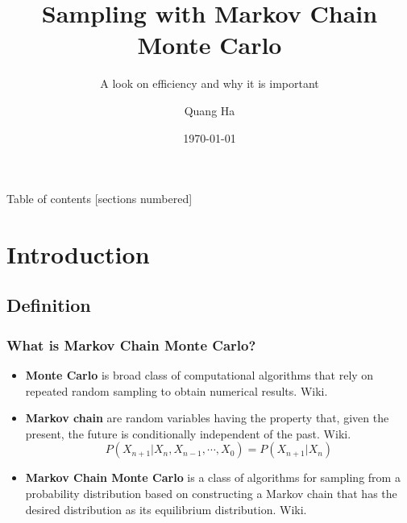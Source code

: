 \documentclass[10pt]{beamer}
\title{Sampling with Markov Chain Monte Carlo}
\subtitle{A look on efficiency and why it is important}
\date{\today}
\author{Quang Ha}
\begin{document}
\maketitle

\begin{frame}[plain]{Table of contents}
	[sections numbered]
	\tableofcontents[hideallsubsections]
\end{frame}	

\section{Introduction}
\subsection{Definition}

\begin{frame}
	\frametitle{What is Markov Chain Monte Carlo?}
	\begin{itemize}
		\item \textbf{Monte Carlo} is broad class of computational algorithms that rely on repeated random sampling to obtain numerical results. \tiny{Wiki}. \normalsize
		\item \textbf{Markov chain} are random variables having the property that, given the present, the future is conditionally independent of the past. \tiny{Wiki}. \normalsize
			\begin{equation*}
				P(X_{n+1}|X_{n}, X_{n-1}, \cdots, X_0) = P(X_{n+1}|X_{n})
			\end{equation*}
		\item \textbf{Markov Chain Monte Carlo} is a class of algorithms for sampling from a probability distribution based on constructing a Markov chain that has the desired distribution as its equilibrium distribution. \tiny{Wiki}. \normalsize
	\end{itemize}
\end{frame} 
\end{document}
